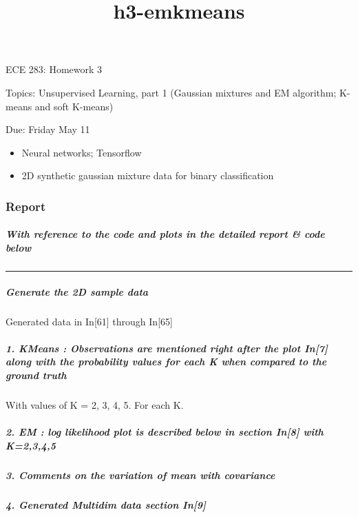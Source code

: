 \documentclass[11pt]{article}
\title{h3-emkmeans}
\providecommand{\tightlist}{%
      \setlength{\itemsep}{0pt}\setlength{\parskip}{0pt}}
\begin{document}
    
    
    \maketitle
    
    

    
    ECE 283: Homework 3

Topics: Unsupervised Learning, part 1 (Gaussian mixtures and EM
algorithm; K-means and soft K-means)

Due: Friday May 11

\begin{itemize}
\tightlist
\item
  Neural networks; Tensorflow
\item
  2D synthetic gaussian mixture data for binary classification
\end{itemize}

    \subsubsection{Report}\label{report}

\subparagraph{With reference to the code and plots in the detailed
report \& code
below}\label{with-reference-to-the-code-and-plots-in-the-detailed-report-code-below}

\begin{center}\rule{0.5\linewidth}{\linethickness}\end{center}

\subparagraph{Generate the 2D sample
data}\label{generate-the-2d-sample-data}

Generated data in In{[}61{]} through In{[}65{]}

\subparagraph{1. KMeans : Observations are mentioned right after the
plot In{[}7{]} along with the probability values for each K when
compared to the ground
truth}\label{kmeans-observations-are-mentioned-right-after-the-plot-in7-along-with-the-probability-values-for-each-k-when-compared-to-the-ground-truth}

With values of K = 2, 3, 4, 5. For each K.

\subparagraph{2. EM : log likelihood plot is described below in section
In{[}8{]} with
K=2,3,4,5}\label{em-log-likelihood-plot-is-described-below-in-section-in8-with-k2345}

\subparagraph{3. Comments on the variation of mean with
covariance}\label{comments-on-the-variation-of-mean-with-covariance}

\subparagraph{4. Generated Multidim data section
In{[}9{]}}\label{generated-multidim-data-section-in9}
\end{document}
